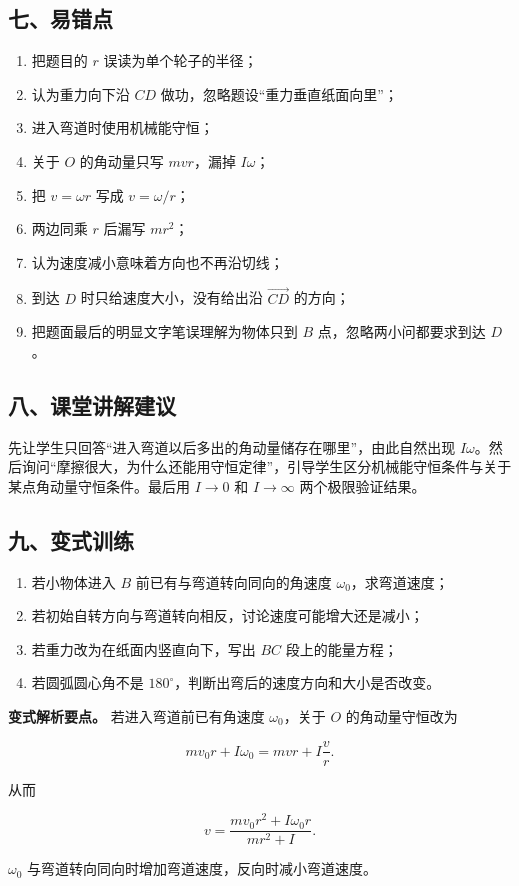 \documentclass[12pt,a4paper,UTF8]{ctexart}
\newcommand{\tightlist}{\setlength{\itemsep}{0pt}\setlength{\parskip}{0pt}}
\begin{document}
\subsection{七、易错点}\label{ux4e03ux6613ux9519ux70b9-7}

\begin{enumerate}
\def\labelenumi{\arabic{enumi}.}
\tightlist
\item
  把题目的 \(r\) 误读为单个轮子的半径；
\item
  认为重力向下沿 \(CD\) 做功，忽略题设``重力垂直纸面向里''；
\item
  进入弯道时使用机械能守恒；
\item
  关于 \(O\) 的角动量只写 \(mvr\)，漏掉 \(I\omega\)；
\item
  把 \(v=\omega r\) 写成 \(v=\omega/r\)；
\item
  两边同乘 \(r\) 后漏写 \(mr^2\)；
\item
  认为速度减小意味着方向也不再沿切线；
\item
  到达 \(D\) 时只给速度大小，没有给出沿 \(\overrightarrow{CD}\) 的方向；
\item
  把题面最后的明显文字笔误理解为物体只到 \(B\) 点，忽略两小问都要求到达
  \(D\)。
\end{enumerate}

\subsection{八、课堂讲解建议}\label{ux516bux8bfeux5802ux8bb2ux89e3ux5efaux8bae-7}

先让学生只回答``进入弯道以后多出的角动量储存在哪里''，由此自然出现
\(I\omega\)。然后询问``摩擦很大，为什么还能用守恒定律''，引导学生区分机械能守恒条件与关于某点角动量守恒条件。最后用
\(I\to0\) 和 \(I\to\infty\) 两个极限验证结果。

\subsection{九、变式训练}\label{ux4e5dux53d8ux5f0fux8badux7ec3-7}

\begin{enumerate}
\def\labelenumi{\arabic{enumi}.}
\tightlist
\item
  若小物体进入 \(B\) 前已有与弯道转向同向的角速度
  \(\omega_0\)，求弯道速度；
\item
  若初始自转方向与弯道转向相反，讨论速度可能增大还是减小；
\item
  若重力改为在纸面内竖直向下，写出 \(BC\) 段上的能量方程；
\item
  若圆弧圆心角不是 \(180^\circ\)，判断出弯后的速度方向和大小是否改变。
\end{enumerate}

\textbf{变式解析要点。} 若进入弯道前已有角速度 \(\omega_0\)，关于 \(O\)
的角动量守恒改为

\[
mv_0r+I\omega_0=mvr+I\frac vr.
\]

从而

\[
v
=\frac{mv_0r^2+I\omega_0r}{mr^2+I}.
\]

\(\omega_0\) 与弯道转向同向时增加弯道速度，反向时减小弯道速度。
\end{document}
